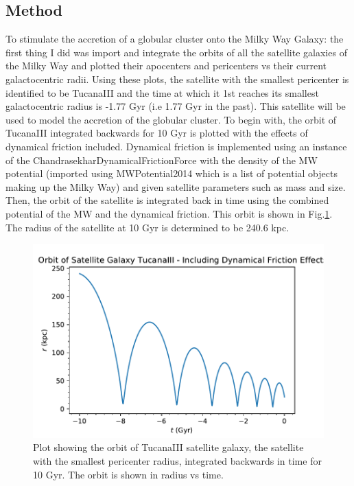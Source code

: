 \documentclass[apj]{emulateapj}
\begin{document}
\subsection{Method}
To stimulate the accretion of a globular cluster onto the Milky Way Galaxy: the first thing I did was import and integrate the orbits of all the satellite galaxies of the Milky Way and plotted their apocenters and pericenters vs their current galactocentric radii. 
Using these plots, the satellite with the smallest pericenter is identified to be TucanaIII and the time at which it 1st reaches its smallest galactocentric radius is -1.77 Gyr (i.e 1.77 Gyr in the past). This satellite will be used to model the accretion of the globular cluster. 
To begin with, the orbit of TucanaIII integrated backwards for 10 Gyr is plotted with the effects of dynamical friction included. Dynamical friction is implemented using an instance of the ChandrasekharDynamicalFrictionForce with the density of the MW potential (imported using MWPotential2014 which is a list of potential objects making up the Milky Way) and given satellite parameters such as mass and size. Then, the orbit of the satellite is integrated back in time using the combined potential of the MW and the dynamical friction. This orbit is shown in Fig.\ref{fig:Q2_cdf}. The radius of the satellite at 10 Gyr is determined to be 240.6 kpc.
\begin{figure}
    \centering
    \includegraphics[width=1.0\columnwidth]{Q2c.pdf}
    \caption{Plot showing the orbit of TucanaIII satellite galaxy, the satellite with the smallest pericenter radius, integrated backwards in time for 10 Gyr. The orbit is shown in radius vs time.}
    \label{fig:Q2_cdf}
\end{figure}
\end{document}
